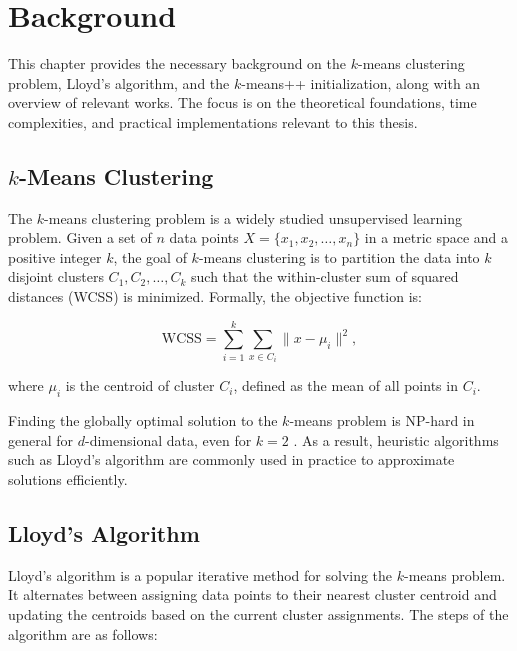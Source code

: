 \chapter{Background}\label{chap:background}

This chapter provides the necessary background on the $k$-means clustering problem, Lloyd's algorithm, and the $k$-means++ initialization, along with an overview of relevant works. The focus is on the theoretical foundations, time complexities, and practical implementations relevant to this thesis.

\section{$k$-Means Clustering}\label{sec:kmeans}

The $k$-means clustering problem is a widely studied unsupervised learning problem. Given a set of \(n\) data points \(X = \{x_1, x_2, \dots, x_n\}\) in a metric space and a positive integer \(k\), the goal of \(k\)-means clustering is to partition the data into \(k\) disjoint clusters \(C_1, C_2, \dots, C_k\) such that the within-cluster sum of squared distances (WCSS) is minimized. Formally, the objective function is:

\[
\text{WCSS} = \sum_{i=1}^k \sum_{x \in C_i} \|x - \mu_i\|^2,
\]

where \(\mu_i\) is the centroid of cluster \(C_i\), defined as the mean of all points in \(C_i\). 

Finding the globally optimal solution to the $k$-means problem is NP-hard in general for \(d\)-dimensional data, even for \(k = 2\) \cite{nphard}. As a result, heuristic algorithms such as Lloyd's algorithm are commonly used in practice to approximate solutions efficiently.

\section{Lloyd’s Algorithm}\label{sec:lloyds}

Lloyd’s algorithm \cite{lloyd,max} is a popular iterative method for solving the $k$-means problem. It alternates between assigning data points to their nearest cluster centroid and updating the centroids based on the current cluster assignments. The steps of the algorithm are as follows:

